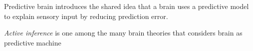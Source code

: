 \begin{frame}{Predictive brain}
    \cite{spratling-2017-a-review-of-predictive-coding-algorithms} introduces the shared idea that a brain uses a predictive model to explain sensory input by reducing prediction error.
    
    \textit{Active inference} \cite{friston-2005-a-predictive-brain-how-perception-and-action-are-coupled-in-neural-networks} is one among the many brain theories that considers brain as predictive machine


\end{frame}